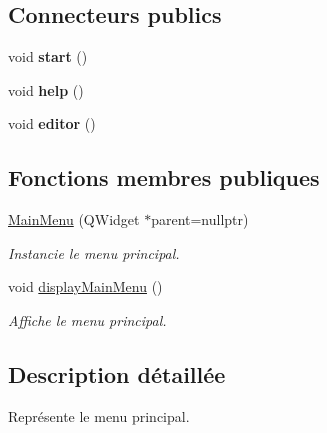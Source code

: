 \subsection*{Connecteurs publics}
\begin{DoxyCompactItemize}
\item 
\hypertarget{classMainMenu_af13a5defbd470cb18edc59d14668aaf4}{void {\bfseries start} ()}\label{classMainMenu_af13a5defbd470cb18edc59d14668aaf4}

\item 
\hypertarget{classMainMenu_aea2e199d621268d691f1aebb7a8f2e31}{void {\bfseries help} ()}\label{classMainMenu_aea2e199d621268d691f1aebb7a8f2e31}

\item 
\hypertarget{classMainMenu_adbce95d3c2192a684d25e6bf2417f073}{void {\bfseries editor} ()}\label{classMainMenu_adbce95d3c2192a684d25e6bf2417f073}

\end{DoxyCompactItemize}
\subsection*{Fonctions membres publiques}
\begin{DoxyCompactItemize}
\item 
\hyperlink{classMainMenu_a891bed1e0edb5492671c332cb89b7a9a}{Main\+Menu} (Q\+Widget $\ast$parent=nullptr)
\begin{DoxyCompactList}\small\item\em Instancie le menu principal. \end{DoxyCompactList}\item 
\hypertarget{classMainMenu_a4b83847fe6109626f6dd4404c8afe4b2}{void \hyperlink{classMainMenu_a4b83847fe6109626f6dd4404c8afe4b2}{display\+Main\+Menu} ()}\label{classMainMenu_a4b83847fe6109626f6dd4404c8afe4b2}

\begin{DoxyCompactList}\small\item\em Affiche le menu principal. \end{DoxyCompactList}\end{DoxyCompactItemize}


\subsection{Description détaillée}
Représente le menu principal. 

